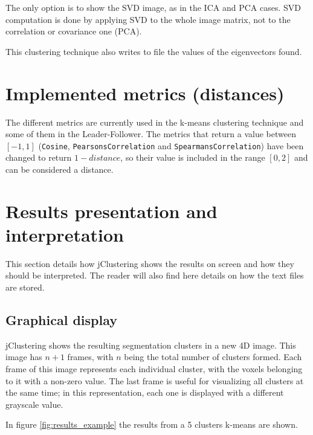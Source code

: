 \documentclass[11pt]{article} %
\begin{document}
The only option is to show the SVD image, as in the ICA and PCA cases. SVD computation is done by applying SVD to the
whole image matrix, not to the correlation or covariance one (PCA).

This clustering technique also writes to file the values of the eigenvectors found.

\section{Implemented metrics (distances)}
\label{sec:metrics}

The different metrics are currently used in the k-means clustering technique and some of them in the Leader-Follower. 
The metrics that return a value between $[-1, 1]$ ({\tt Cosine}, {\tt PearsonsCorrelation} and 
{\tt SpearmansCorrelation}) have been changed to return $1 - distance$, so their value is included in the range $[0, 2]$ and
can be considered a distance.

\section{Results presentation and interpretation}
\label{sec:results}

This section details how jClustering shows the results on screen and how they should be interpreted. The reader will also
find here details on how the text files are stored.

\subsection{Graphical display}
\label{subsec:results_graphical}

jClustering shows the resulting segmentation clusters in a new 4D image. This image has $n+1$ frames, with $n$ being the
total number of clusters formed. Each frame of this image represents each individual cluster, with the voxels belonging to it
with a non-zero value. The last frame is useful for visualizing all clusters at the same time; in this representation, each one is 
displayed with a different grayscale value.

In figure \ref{fig:results_example} the results from a 5 clusters k-means are shown.
\end{document}
